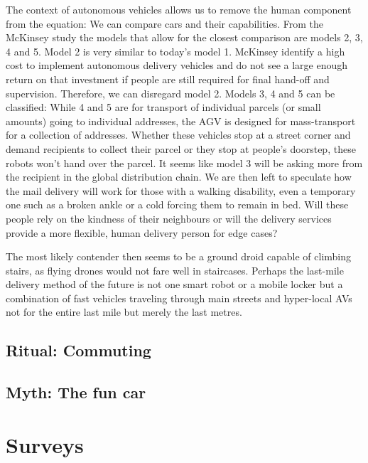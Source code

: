 \documentclass[12pt, usenames, dvipsnames]{report}
\begin{document}
\begin{flushleft}
The context of autonomous vehicles allows us to remove the human component from the equation:
We can compare cars and their capabilities. 
From the McKinsey study \cite{mckinsey2016} the models that allow for the closest comparison are models 2, 3, 4 and 5.
Model 2 is very similar to today's model 1.
McKinsey identify a high cost to implement autonomous delivery vehicles and do not see a large enough return on that investment if people are still required for final hand-off and supervision.
Therefore, we can disregard model 2.
Models 3, 4 and 5 can be classified:
While 4 and 5 are for transport of individual parcels (or small amounts) going to individual addresses, the AGV is designed for mass-transport for a collection of addresses.
Whether these vehicles stop at a street corner and demand recipients to collect their parcel or they stop at people's doorstep, these robots won't hand over the parcel.
It seems like model 3 will be asking more from the recipient in the global distribution chain.
We are then left to speculate how the mail delivery will work for those with a walking disability, even a temporary one such as a broken ankle or a cold forcing them to remain in bed.
Will these people rely on the kindness of their neighbours or will the delivery services provide a more flexible, human delivery person for edge cases?

The most likely contender then seems to be a ground droid capable of climbing stairs, as flying drones would not fare well in staircases.
Perhaps the last-mile delivery method of the future is not one smart robot or a mobile locker but a combination of fast vehicles traveling through main streets and hyper-local AVs not for the entire last mile but merely the last metres. 


\section{Ritual: Commuting}


\section{Myth: The fun car}


\chapter{Surveys}


\end{flushleft}
\end{document}
